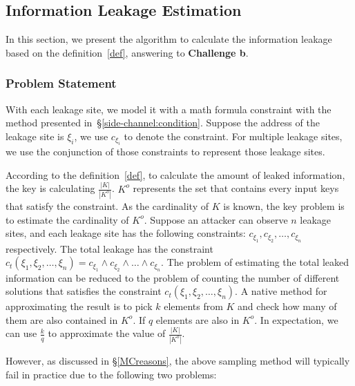 \subsection{Information Leakage Estimation}

\newcommand{\addr}[1]{{l}_{#1}}
\renewcommand{\addr}[1]{{\gamma}_{#1}}
\renewcommand{\addr}[1]{{\zeta}_{#1}}
\renewcommand{\addr}[1]{{\xi}_{#1}}

In this section, we present the algorithm to calculate the information
leakage based on the definition~\ref{def}, answering to
\textbf{Challenge b}. 

\subsubsection{Problem Statement}
With each leakage site, we model it with a math formula constraint with the method 
presented in~\S\ref{side-channel:condition}.
Suppose the address of the leakage site is $\addr{i}$,
we use $c_{\addr{i}}$ to denote the constraint. For multiple leakage sites, 
we use the conjunction of those constraints to represent those leakage sites. 

According to the definition~\ref{def}, to calculate the amount of leaked 
information, the key is calculating $\frac{|K|}{|K^o|}$. $K^o$ represents
the set that contains every input keys that satisfy the constraint. As the 
cardinality of $K$ is known, the key problem is to estimate the cardinality of
$K^o$. Suppose an attacker can observe $n$ leakage sites, and each leakage site has
the following constraints: $c_{\addr{1}}, c_{\addr{2}}, \ldots, c_{\addr{n}}$ respectively. 
The total leakage has the constraint 
$c_t({\addr{1}},{\addr{2}},\ldots,{\addr{n}}) = c_{\addr{1}} \land c_{\addr{2}} 
\land \ldots \land c_{\addr{n}}$. The problem of estimating the total leaked information 
can be reduced to the problem of counting the number of different solutions 
that satisfies the constraint $c_t({\addr{1}},{\addr{2}},\ldots,{\addr{n}})$. 
A native method for approximating 
the result is to pick $k$ elements from $K$ and check how many of them are also
contained in $K^o$. If $q$ elements are also in $K^o$. In expectation, we can
use $\frac{k}{q}$ to approximate the value of $\frac{|K|}{|K^o|}$.

However, as discussed in \S\ref{MCreasons},
the above sampling method will typically fail in practice due to the following two problems:


